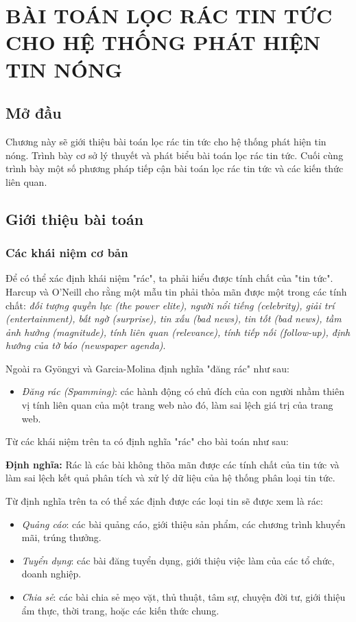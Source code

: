 \chapter{BÀI TOÁN LỌC RÁC TIN TỨC CHO HỆ THỐNG PHÁT HIỆN TIN NÓNG}
\ifpdf
    \graphicspath{{Chapter2/Chapter2Figs/PNG/}{Chapter2/Chapter2Figs/PDF/}{Chapter2/Chapter2Figs/}}
\else
    \graphicspath{{Chapter2/Chapter2Figs/EPS/}{Chapter2/Chapter2Figs/}}
\fi

\section{Mở đầu}
Chương này sẽ giới thiệu bài toán lọc rác tin tức cho hệ thống phát hiện tin nóng. Trình bày cơ sở lý thuyết và phát biểu bài toán lọc rác tin tức. Cuối cùng trình bày một số phương pháp tiếp cận bài toán lọc rác tin tức  và các kiến thức liên quan.
\section{Giới thiệu bài toán} %
	\subsection{Các khái niệm cơ bản}
  Để có thể xác định khái niệm "rác", ta phải hiểu được tính chất của "tin tức". Harcup và O'Neill  cho rằng một mẫu tin phải thỏa mãn được một trong các tính chất: \textit{đối tượng quyền lực (the power elite), người nổi tiếng (celebrity), giải trí (entertainment), bất ngờ (surprise), tin xấu (bad news), tin tốt (bad news), tầm ảnh hưởng (magnitude), tính liên quan (relevance), tính tiếp nối (follow-up), định hướng của tờ báo (newspaper agenda)}\cite{doi:10.1080/14616700118449}.

  Ngoài ra Gy\"{o}ngyi và Garcia-Molina định nghĩa "đăng rác" như sau: 
	\begin{itemize}
    \item \textit{Đăng rác (Spamming)}: các hành động có chủ đích của con người nhầm thiên vị tính liên quan của một trang web nào đó, làm sai lệch giá trị của trang web.
	\end{itemize}

  Từ các khái niệm trên ta có định nghĩa "rác" cho bài toán như sau:

  \textbf{Định nghĩa:} Rác là các bài không thõa mãn được các tính chất của tin tức và làm sai lệch kết quả phân tích và xử lý dữ liệu của hệ thống phân loại tin tức. 

  Từ định nghĩa trên ta có thể xác định được các loại tin sẽ được xem là rác:
  \begin{itemize}
    \item \textit{Quảng cáo}: các bài quảng cáo, giới thiệu sản phẩm, các chương trình khuyển mãi, trúng thưởng.
    \item \textit{Tuyển dụng}: các bài đăng tuyển dụng, giới thiệu việc làm của các tổ chức, doanh nghiệp.
    \item \textit{Chia sẻ}: các bài chia sẻ mẹo vặt, thủ thuật, tâm sự, chuyện đời tư, giới thiệu ẩm thực, thời trang, hoặc các kiến thức chung.
  \end{itemize}

